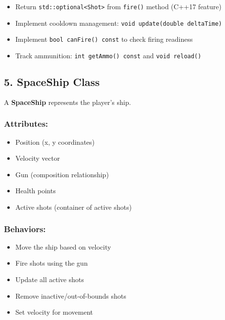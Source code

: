 \documentclass[
]{article}
\providecommand{\tightlist}{%
  \setlength{\itemsep}{0pt}\setlength{\parskip}{0pt}}
\begin{document}
\begin{itemize}
\tightlist
\item
  Return \texttt{std::optional\textless{}Shot\textgreater{}} from
  \texttt{fire()} method (C++17 feature)
\item
  Implement cooldown management:
  \texttt{void\ update(double\ deltaTime)}
\item
  Implement \texttt{bool\ canFire()\ const} to check firing readiness
\item
  Track ammunition: \texttt{int\ getAmmo()\ const} and
  \texttt{void\ reload()}
\end{itemize}

\subsection{5. SpaceShip Class}\label{spaceship-class}

A \textbf{SpaceShip} represents the player's ship.

\subsubsection{Attributes:}\label{attributes-2}

\begin{itemize}
\tightlist
\item
  Position (x, y coordinates)
\item
  Velocity vector
\item
  Gun (composition relationship)
\item
  Health points
\item
  Active shots (container of active shots)
\end{itemize}

\subsubsection{Behaviors:}\label{behaviors-2}

\begin{itemize}
\tightlist
\item
  Move the ship based on velocity
\item
  Fire shots using the gun
\item
  Update all active shots
\item
  Remove inactive/out-of-bounds shots
\item
  Set velocity for movement
\end{itemize}
\end{document}
